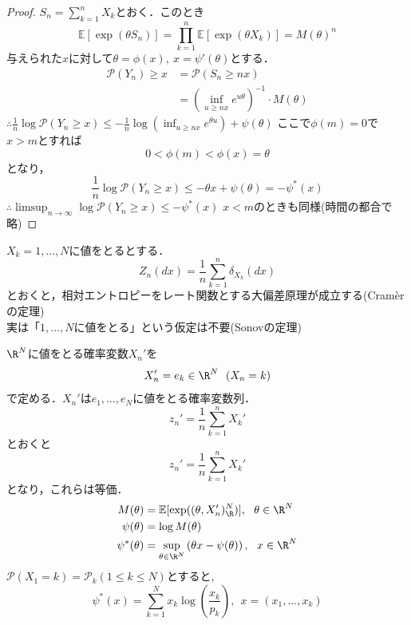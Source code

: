 \begin{proof}
    $S_n= \sum_{k= 1}^n X_k$とおく．このとき
\begin{equation}
    \mathbb{E}[\exp(\theta S_n)]= \prod_{k= 1}^n \mathbb{E}[\exp(\theta X_k)]= M(\theta)^n
\end{equation}
    与えられた$x$に対して$\theta= \phi(x),\ x= \psi'(\theta)$とする．
\begin{align}
    \mathcal{P}(Y_n)\ge x
    &= \mathcal{P}(S_n\ge nx)\\
    &= \left(\inf_{u\ge nx} e^{u\theta}\right)^{-1}\cdot M(\theta)
\end{align}
    $\therefore \frac{1}{n}\log{\mathcal{P}(Y_n\ge x)}\le -\frac{1}{n}\log{\left(\inf_{u\ge nx} e^{\theta u}\right)}+ \psi(\theta)$
    ここで$\phi(m)= 0$で$x> m$とすれば
\begin{equation}
    0< \phi(m)< \phi(x)= \theta
\end{equation}
    となり，
\begin{equation}
    \frac{1}{n}\log{\mathcal{P}(Y_n\ge x)}\le -\theta x+ \psi(\theta)= -\psi^*(x)
\end{equation}
    $\therefore \limsup_{n\to \infty} \log{\mathcal{P}(Y_n\ge x)}\le -\psi^*(x)$
    $x< m$のときも同様(時間の都合で略)
\end{proof}
    $X_k= 1, \ldots, N$に値をとるとする．
\begin{equation}
    Z_n(dx)= \frac{1}{n}\sum_{k= 1}^n \delta_{X_k}(dx)
\end{equation}
    とおくと，相対エントロピーをレート関数とする大偏差原理が成立する(Cram\`erの定理)\\
    実は「$1, \ldots, N$に値をとる」という仮定は不要(Sonovの定理)

    $\R^N$に値をとる確率変数$X_n'$を
\begin{equation}
    X_n'= e_k\in \R^N\ \ (X_n= k)
\end{equation}
    で定める．$X_n'$は$e_1, \ldots, e_N$に値をとる確率変数列．
\begin{equation}
    z_n'= \frac{1}{n}\sum_{k= 1}^n X_k'
\end{equation}
    とおくと
\begin{equation}
    z_n'= \frac{1}{n}\sum_{k= 1}^n X_k'
\end{equation}
    となり，これらは等価．
\begin{align}
    M(\theta)&= \mathbb{E}[\exp((\theta, X_n')_\R^N)],\ \ \theta\in \R^N\\
    \psi(\theta)&= \log{M(\theta)}\\
    \psi^*(\theta)&= \sup_{\theta\in \R^N} \left(\theta x- \psi(\theta)\right),\ \ x\in \R^N
\end{align}
    $\mathcal{P}(X_1= k)= \mathcal{P}_k(1\le k\le N)$とすると,
\begin{equation}
    \psi^*(x)= \sum_{k= 1}^N x_k\log{\left(\frac{x_k}{p_k}\right)},\ \ x= (x_1, \ldots, x_k)
\end{equation}
